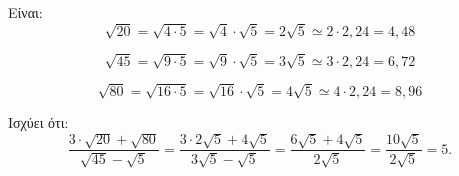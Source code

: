 
\begin{alist}
\item Είναι:
\[\sqrt{20} = \sqrt{4 \cdot 5} = \sqrt{4} \cdot \sqrt{5} = 2\sqrt{5} \simeq 2 \cdot 2,24 = 4,48\]

\[\sqrt{45} = \sqrt{9 \cdot 5} = \sqrt{9} \cdot \sqrt{5} = 3\sqrt{5} \simeq 3 \cdot 2,24 = 6,72\]

\[\sqrt{80} = \sqrt{16 \cdot 5} = \sqrt{16} \cdot \sqrt{5} = 4\sqrt{5} \simeq 4 \cdot 2,24 = 8,96\]

\item Ισχύει ότι:
\[\dfrac{3 \cdot \sqrt{20} + \sqrt{80}}{\sqrt{45} - \sqrt{5}} = \dfrac{3 \cdot 2\sqrt{5} + 4\sqrt{5}}{3\sqrt{5} - \sqrt{5}} = \dfrac{6\sqrt{5} + 4\sqrt{5}}{2\sqrt{5}} = \dfrac{10\sqrt{5}}{2\sqrt{5}} = 5.\]
\end{alist}

